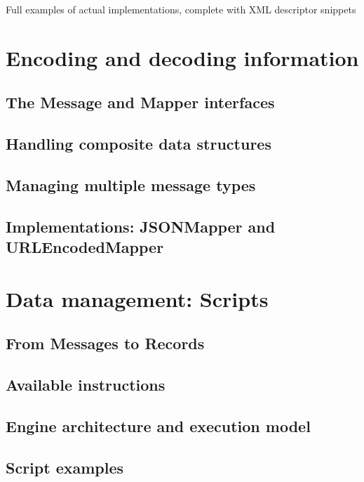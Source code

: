 Full examples of actual implementations, complete with XML descriptor snippets


\section{Encoding and decoding information}
\label{sec:components.mapper}

\subsection{The Message and Mapper interfaces}

\subsection{Handling composite data structures}

\subsection{Managing multiple message types}

\subsection{Implementations: JSONMapper and URLEncodedMapper}


\section{Data management: Scripts}
\label{sec:components.script}

\subsection{From Messages to Records}

\subsection{Available instructions}

\subsection{Engine architecture and execution model}

\subsection{Script examples}


